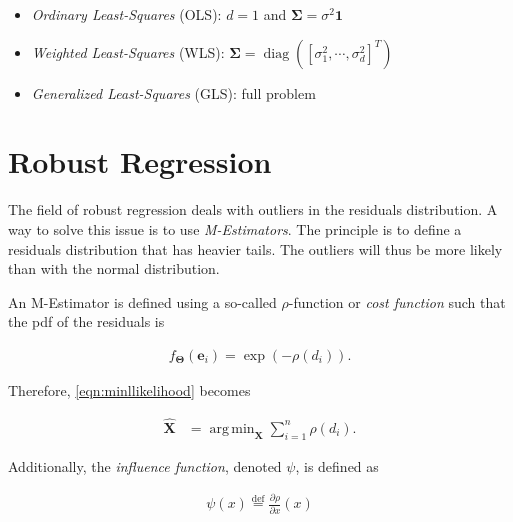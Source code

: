 \documentclass[12pt]{article}
\DeclareMathOperator*{\argmin}{arg\,min}
\DeclareMathOperator{\diag}{diag}
\begin{document}
  \begin{itemize}
    \item \emph{Ordinary Least-Squares} (OLS): $d=1$ and
      $\boldsymbol{\Sigma}=\sigma^2\mathbf{1}$
    \item \emph{Weighted Least-Squares} (WLS):
      $\boldsymbol{\Sigma}=\diag([\sigma_1^2,\cdots,\sigma_d^2]^T)$
    \item \emph{Generalized Least-Squares} (GLS): full problem
  \end{itemize}

  \section{Robust Regression}

  The field of robust regression deals with outliers in the residuals
  distribution. A way to solve this issue is to use
  \emph{M-Estimators}. The principle is to define a residuals distribution that
  has heavier tails. The outliers will thus be more likely than with the normal
  distribution.

  An M-Estimator is defined using a so-called $\rho$-function or
  \emph{cost function} such that the pdf of the residuals is

  \begin{equation}\label{eqn:mestimatorpdf}
    \begin{aligned}
      f_{\boldsymbol{\Theta}}(\mathbf{e}_i) = \exp(-\rho(d_i)).
    \end{aligned}
  \end{equation}

  \noindent Therefore, \eqref{eqn:minllikelihood} becomes

  \begin{equation}\label{eqn:minllikelihoodmest}
    \begin{aligned}
      \mathbf{\hat{X}} &=
        \argmin_{\mathbf{X}}\sum_{i=1}^n \rho(d_i).
    \end{aligned}
  \end{equation}

  \noindent Additionally, the \emph{influence function}, denoted $\psi$, is
  defined as

  \begin{equation}\label{eqn:influence}
    \begin{aligned}
      \psi(x) \stackrel{\mathrm{def}}{=} \frac{\partial \rho}{\partial x} (x)
    \end{aligned}
  \end{equation}
\end{document}
